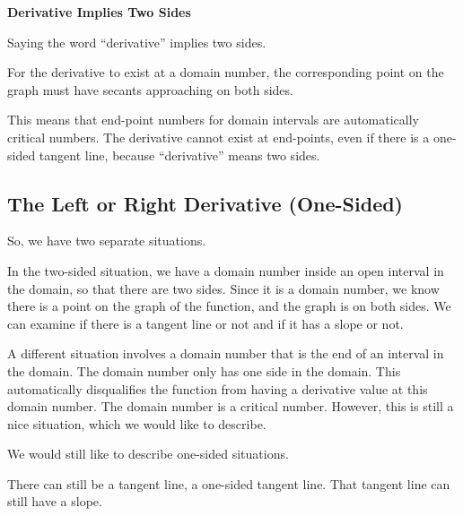 \documentclass{ximera}
\begin{document}
\begin{warning} \textbf{\textcolor{red!70!black}{Derivative Implies Two Sides}}

Saying the word ``derivative'' implies two sides. 

For the derivative to exist at a domain number, the corresponding point on the graph must have secants approaching on both sides. 


This means that end-point numbers for domain intervals are automatically critical numbers.  The derivative cannot exist at end-points, even if there is a one-sided tangent line, because ``derivative'' means two sides. 

\end{warning}





























\subsection*{The Left or Right Derivative (One-Sided)}


So, we have two separate situations. 


In the two-sided situation, we have a domain number inside an open interval in the domain, so that there are two sides. Since it is a domain number, we know there is a point on the graph of the function, and the graph is on both sides.  We can examine if there is a tangent line or not and if it has a slope or not. 

A different situation involves a domain number that is the end of an interval in the domain.  The domain number only has one side in the domain.  This automatically disqualifies the function from having a derivative value at this domain number.  The domain number is a critical number.  However, this is still a nice situation, which we would like to describe. 

We would still like to describe one-sided situations. 

There can still be a tangent line, a one-sided tangent line. That tangent line can still have a slope. 
\end{document}
